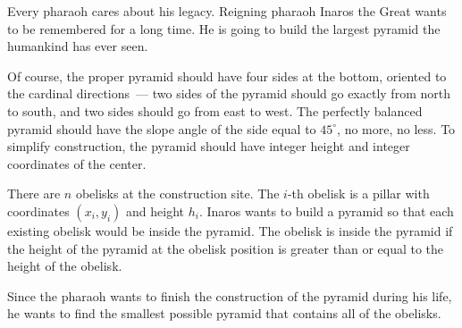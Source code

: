 Every pharaoh cares about his legacy. Reigning pharaoh Inaros the Great wants to be remembered for a long time. He is going to build the largest pyramid the humankind has ever seen. 

Of course, the proper pyramid should have four sides at the bottom, oriented to the cardinal directions~--- two sides of the pyramid should go exactly from north to south, and two sides should go from east to west. The perfectly balanced pyramid should have the slope angle of the side equal to $45^{\circ}$, no more, no less. To simplify construction, the pyramid should have integer height and integer coordinates of the center.

There are $n$ obelisks at the construction site. The $i$-th obelisk is a pillar with coordinates $(x_i, y_i)$ and height $h_i$. Inaros wants to build a pyramid so that each existing obelisk would be inside the pyramid. The obelisk is inside the pyramid if the height of the pyramid at the obelisk position is greater than or equal to the height of the obelisk.

Since the pharaoh wants to finish the construction of the pyramid during his life, he wants to find the smallest possible pyramid that contains all of the obelisks.

